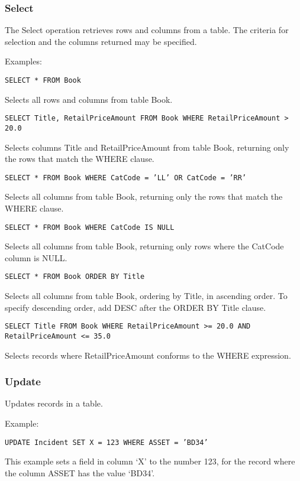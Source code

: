 \subsubsection{Select}

The Select operation retrieves rows and columns from a table. The criteria
for selection and the columns returned may be specified.

Examples:

{\tt SELECT * FROM Book}

Selects all rows and columns from table Book.

{\tt SELECT Title, RetailPriceAmount FROM Book WHERE RetailPriceAmount > 20.0}

Selects columns Title and RetailPriceAmount from table Book, returning only
the rows that match the WHERE clause.

{\tt SELECT * FROM Book WHERE CatCode = 'LL' OR CatCode = 'RR'}

Selects all columns from table Book, returning only
the rows that match the WHERE clause.

{\tt SELECT * FROM Book WHERE CatCode IS NULL}

Selects all columns from table Book, returning only rows where the CatCode column
is NULL.

{\tt SELECT * FROM Book ORDER BY Title}

Selects all columns from table Book, ordering by Title, in ascending order. To specify
descending order, add DESC after the ORDER BY Title clause.

{\tt SELECT Title FROM Book WHERE RetailPriceAmount >= 20.0 AND RetailPriceAmount <= 35.0}

Selects records where RetailPriceAmount conforms to the WHERE expression.

\subsubsection{Update}

Updates records in a table.

Example:

{\tt UPDATE Incident SET X = 123 WHERE ASSET = 'BD34'}

This example sets a field in column `X' to the number 123, for the record
where the column ASSET has the value `BD34'.

